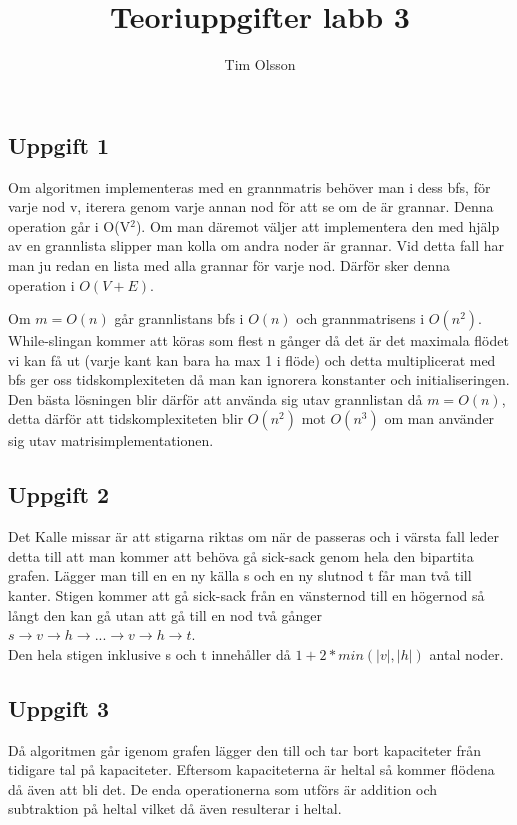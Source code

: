 \documentclass[11pt,a4paper,article,oneside]{memoir}
\author{Tim Olsson}
\begin{document}
\begin{titlingpage}
\end{titlingpage}


\title{Teoriuppgifter labb 3}

\maketitle

\subsection{Uppgift 1}


Om algoritmen implementeras med en grannmatris behöver man i dess bfs, för varje nod v, iterera genom varje
annan nod för att se om de är grannar. Denna operation går i O(V$^2$). Om man däremot väljer att implementera den med hjälp 
av en grannlista slipper man kolla om andra noder är grannar. Vid detta fall har man ju redan en lista med alla grannar för varje nod. Därför sker denna operation i $O(V+E)$. 

Om $m = O(n)$ går grannlistans bfs i $O(n)$ och grannmatrisens i $O(n^2)$. While-slingan kommer att köras som flest n gånger då det är det maximala flödet vi kan få ut (varje kant kan bara ha max 1 i flöde) och detta multiplicerat 
med bfs ger oss tidskomplexiteten då man kan ignorera konstanter och initialiseringen.
Den bästa lösningen blir därför att använda sig utav grannlistan då $m=O(n)$, detta därför att tidskomplexiteten 
blir $O(n^2)$ mot $O(n^3)$ om man använder sig utav matrisimplementationen.

\subsection{Uppgift 2}
Det Kalle missar är att stigarna riktas om när de passeras och i värsta fall leder detta till att man 
kommer att behöva gå sick-sack genom hela den bipartita grafen. Lägger man till en en ny källa s och en ny slutnod t får man 
två till kanter. Stigen kommer att gå sick-sack från en vänsternod till en högernod så långt den kan gå utan att gå till en nod två gånger \\$ s \rightarrow v \rightarrow h \rightarrow ... \rightarrow v \rightarrow h \rightarrow t$.\\ Den hela stigen inklusive s och t innehåller då $1+2*min(|v|,|h|)$ antal noder.

\subsection{Uppgift 3}
Då algoritmen går igenom grafen lägger den till och tar bort kapaciteter från tidigare tal på kapaciteter. Eftersom kapaciteterna 
är heltal så kommer flödena då även att bli det. De enda operationerna som utförs är addition och subtraktion på heltal vilket då även resulterar i heltal.
\end{document}
